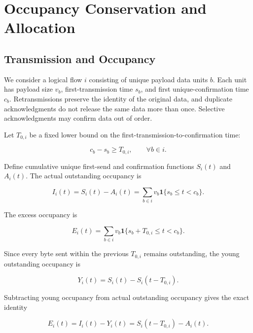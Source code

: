 \section{Occupancy Conservation and Allocation}
\label{app:a}

\subsection{Transmission and Occupancy}
\label{app:a-1}

We consider a logical flow \(i\) consisting of unique payload data units \(b\). Each unit has payload size \(v_b\), first-transmission time \(s_b\), and first unique-confirmation time \(c_b\). Retransmissions preserve the identity of the original data, and duplicate acknowledgments do not release the same data more than once. Selective acknowledgments may confirm data out of order.

Let \(T_{0,i}\) be a fixed lower bound on the first-transmission-to-confirmation time:

\begin{equation}
\label{eq:app-a-1}
c_b-s_b\ge T_{0,i},\qquad \forall b\in i.
\end{equation}

Define cumulative unique first-send and confirmation functions \(S_i(t)\) and \(A_i(t)\). The actual outstanding occupancy is

\begin{equation}
\label{eq:app-a-2}
I_i(t)=S_i(t)-A_i(t)
=\sum_{b\in i}v_b\mathbf 1\{s_b\le t<c_b\}.
\end{equation}

The excess occupancy is

\begin{equation}
\label{eq:app-a-3}
E_i(t)
=\sum_{b\in i}v_b
\mathbf 1\{s_b+T_{0,i}\le t<c_b\}.
\end{equation}

Since every byte sent within the previous \(T_{0,i}\) remains outstanding, the young outstanding occupancy is

\begin{equation}
\label{eq:app-a-4}
Y_i(t)=S_i(t)-S_i(t-T_{0,i}).
\end{equation}

Subtracting young occupancy from actual outstanding occupancy gives the exact identity

\begin{equation}
\label{eq:app-a-5}
\boxed{
E_i(t)=I_i(t)-Y_i(t)
=S_i(t-T_{0,i})-A_i(t).
}
\end{equation}

